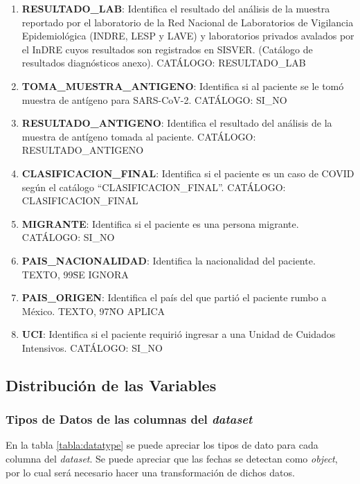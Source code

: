 \begin{enumerate}
	\item \textbf{RESULTADO\_LAB}: Identifica el resultado del análisis de la muestra reportado por el  laboratorio de la Red Nacional de Laboratorios de Vigilancia Epidemiológica (INDRE, LESP y LAVE) y laboratorios privados avalados por el InDRE cuyos resultados son registrados en SISVER. (Catálogo de resultados diagnósticos anexo). CATÁLOGO: RESULTADO\_LAB
	\item \textbf{TOMA\_MUESTRA\_ANTIGENO}: Identifica si al paciente se le tomó muestra de antígeno para SARS-CoV-2. CATÁLOGO: SI\_NO
	\item \textbf{RESULTADO\_ANTIGENO}: Identifica el resultado del análisis de la muestra de antígeno tomada al paciente. CATÁLOGO: RESULTADO\_ANTIGENO
	\item \textbf{CLASIFICACION\_FINAL}: Identifica si el paciente es un caso de COVID según el catálogo ``CLASIFICACION\_FINAL''. CATÁLOGO: CLASIFICACION\_FINAL
	\item \textbf{MIGRANTE}: Identifica si el paciente es una persona migrante. CATÁLOGO: SI\_NO
	\item \textbf{PAIS\_NACIONALIDAD}: Identifica la nacionalidad del paciente. TEXTO, 99\=SE IGNORA
	\item \textbf{PAIS\_ORIGEN}: Identifica el país del que partió el paciente rumbo a México. TEXTO, 97\=NO APLICA
	\item \textbf{UCI}: Identifica si el paciente requirió ingresar a una Unidad de Cuidados Intensivos. CATÁLOGO: SI\_NO
\end{enumerate}

\clearpage

\subsection{Distribución de las Variables}
\subsubsection{Tipos de Datos de las columnas del \emph{dataset}}
En la tabla \ref{tabla:datatype} se puede apreciar los tipos de dato para cada columna del \emph{dataset}. Se puede apreciar que las fechas se detectan como \emph{object}, por lo cual será necesario hacer una transformación de dichos datos.

